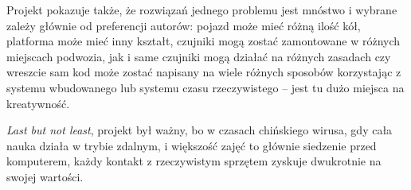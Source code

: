 \documentclass[11pt]{article}
\begin{document}
Projekt pokazuje także, że rozwiązań jednego problemu jest mnóstwo i wybrane zależy głównie od preferencji autorów: pojazd może mieć różną ilość kół, platforma może mieć inny kształt, czujniki mogą zostać zamontowane w różnych miejscach podwozia, jak i same czujniki mogą działać na różnych zasadach czy wreszcie sam kod może zostać napisany na wiele różnych sposobów korzystając z systemu wbudowanego lub systemu czasu rzeczywistego -- jest tu dużo miejsca na kreatywność.

\emph{Last but not least}, projekt był ważny, bo w czasach chińskiego wirusa, gdy cała nauka działa w trybie zdalnym, i większość zajęć to głównie siedzenie przed komputerem, każdy kontakt z rzeczywistym sprzętem zyskuje dwukrotnie na swojej wartości.

\newpage


\phantom{a}



\newpage
\end{document}
